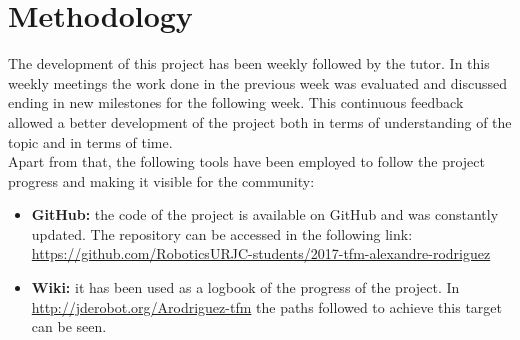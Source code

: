 \section{Methodology} \label{Methodology}
The development of this project has been weekly followed by the tutor. In this weekly meetings the work done in the previous week was evaluated and discussed ending in new milestones for the following week. This continuous feedback allowed a better development of the project both in terms of understanding of the topic and in terms of time.\\
Apart from that, the following tools have been employed to follow the project progress and making it visible for the community:
\begin{itemize}
    \item \textbf{GitHub:} the code of the project is available on GitHub and was constantly updated. The repository can be accessed in the following link: \url{https://github.com/RoboticsURJC-students/2017-tfm-alexandre-rodriguez}
    \item \textbf{Wiki:} it has been used as a logbook of the progress of the project. In \url{http://jderobot.org/Arodriguez-tfm} the paths followed to achieve this target can be seen.
\end{itemize}
